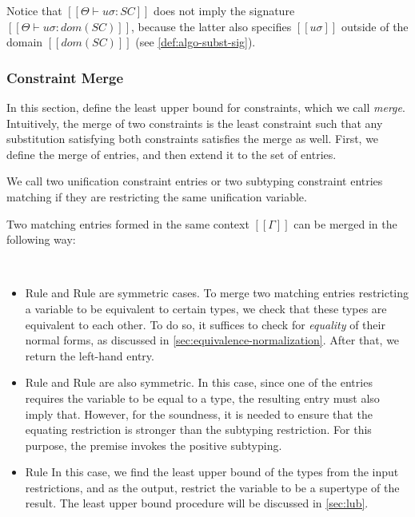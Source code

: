 \documentclass[a4,natbib=false]{article}
\newcommand{\ruleref}[1]{Rule \nameref{#1}}
\begin{document}
Notice that $[[Θ ⊢ uσ : SC]]$ does not 
imply the signature $[[Θ ⊢ uσ : dom(SC)]]$, because 
the latter also specifies $[[uσ]]$ outside of the domain $[[dom(SC)]]$
(see \cref{def:algo-subst-sig}).


\subsubsection{Constraint Merge}
\label{sec:constraint-merge}

In this section, define the least upper bound 
for constraints, which we call \emph{merge}.
Intuitively, the merge of two constraints is the least
constraint such that any substitution satisfying both constraints
satisfies the merge as well.
First, we define the merge of entries,
and then extend it to the set of entries.

\begin{definition} 
  We call two unification constraint entries 
  or two subtyping constraint entries matching 
  if they are restricting the same unification variable.
\end{definition}

Two matching entries formed in the same context $[[Γ]]$ 
can be merged in the following way:
\begin{algorithm}
  \label{definition:merge-matching-entries}
   \hfill 

  \ottdefnSCME\\
\end{algorithm}

\begin{itemize}
  \item \ruleref{\ottdruleSCMEPEqEqLabel} and \ruleref{\ottdruleSCMENEqEqLabel}
    are symmetric cases. To merge two matching entries restricting
    a variable to be equivalent to certain types, we check
    that these types are equivalent to each other.
    To do so, it suffices to check for \emph{equality} of their normal forms,
    as discussed in \cref{sec:equivalence-normalization}. 
    After that, we return the left-hand entry.

  \item \ruleref{\ottdruleSCMEEqSupLabel} and \ruleref{\ottdruleSCMESupEqLabel}
    are also symmetric. 
    In this case,
    since one of the entries requires the variable to be equal to 
    a type, the resulting entry must also imply that.
    However, for the soundness, it is needed to ensure that
    the equating restriction is stronger than the subtyping restriction.
    For this purpose, the premise invokes the positive subtyping.

  \item \ruleref{\ottdruleSCMESupSupLabel} 
    In this case, we find the least upper bound of the types from the input
    restrictions, 
    and as the output, restrict the variable to be a supertype of the result.
    The least upper bound procedure will be discussed in \cref{sec:lub}.
\end{itemize}
\end{document}
